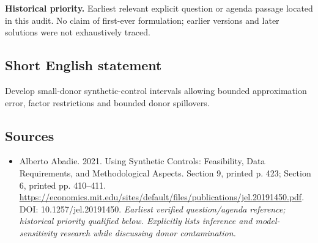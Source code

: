 \documentclass[11pt]{article}
\begin{document}
\par\textbf{Historical priority.} Earliest relevant explicit question or agenda passage located in this audit. No claim of first-ever formulation; earlier versions and later solutions were not exhaustively traced.

\subsection{Short English statement}
Develop small-donor synthetic-control intervals allowing bounded approximation error, factor restrictions and bounded donor spillovers.

\subsection{Sources}
\begin{itemize}\raggedright
\item[\textnormal{[S1]}]\hypertarget{source:30007707:1}{} Alberto Abadie. 2021. Using Synthetic Controls: Feasibility, Data Requirements, and Methodological Aspects. Section 9, printed p. 423; Section 6, printed pp. 410–411.
\url{https://economics.mit.edu/sites/default/files/publications/jel.20191450.pdf}.
DOI: 10.1257/jel.20191450.
{\small\textit{Earliest verified question/agenda reference; historical priority qualified below. Explicitly lists inference and model-sensitivity research while discussing donor contamination.}}
\end{itemize}
\end{document}
